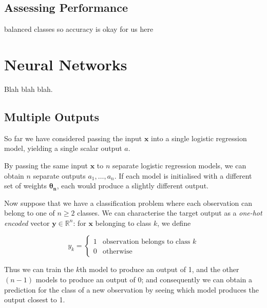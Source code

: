 \documentclass{article}[11pt]
\begin{document}
                
            
            
            
    \subsection{Assessing Performance}
        
        
        balanced classes so accuracy is okay for us here



\section{Neural Networks}
    
    Blah blah blah.
    
    
    

    \subsection{Multiple Outputs} \label{sec:multi_out}
    
        So far we have considered passing the input $\mathbf{x}$ into a single logistic regression model, yielding a single scalar output $a$.
    
        By passing the same input $\mathbf{x}$ to $n$ separate logistic regression models, we can obtain $n$ separate outputs $a_1, \ldots, a_n$. If each model is initialised with a different set of weights $\boldsymbol{\theta_n}$, each would produce a slightly different output.
        
        Now suppose that we have a classification problem where each observation can belong to one of $n \geq 2$ classes. We can characterise the target output as a \textit{one-hot encoded} vector $\mathbf{y} \in \mathbb{R}^n$: for $\mathbf{x}$ belonging to class $k$, we define
        
        $$
        y_k = \begin{cases}
            1 & \text{observation belongs to class } k \\
            0 & \text{otherwise}
        \end{cases}
        $$
        
        Thus we can train the $k$th model to produce an output of 1, and the other $(n-1)$ models to produce an output of 0; and consequently we can obtain a prediction for the class of a new observation by seeing which model produces the output closest to 1.
\end{document}
